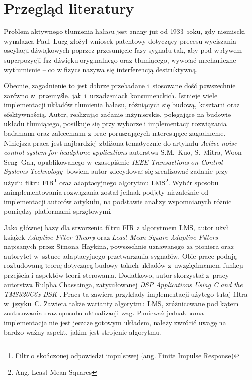 \section{Przegląd literatury}
Problem aktywnego tłumienia hałasu jest znany już od 1933~roku, gdy niemiecki wynalazca Paul~Lueg złożył wniosek patentowy \cite{LuegPatent} dotyczący procesu wyciszania oscylacji dźwiękowych poprzez przesunięcie fazy sygnału tak, aby pod wpływem superpozycji faz dźwięku oryginalnego oraz tłumiącego, wywołać mechaniczne wytłumienie -- co w fizyce nazywa się interferencją destruktywną.

Obecnie, zagadnienie to jest dobrze przebadane i~stosowane dość powszechnie zarówno w~przemyśle, jak~i~urządzeniach konsumenckich. Istnieje wiele implementacji układów tłumienia hałasu, różniących się budową, kosztami oraz efektywnością. Autor, realizując zadanie inżynierskie, polegające na budowie układu tłumiącego, posiłkuje się przy wyborze i implementacji rozwiązania badaniami oraz zaleceniami z prac poruszających interesujące zagadnienie. Niniejsza praca jest najbardziej zbliżona tematycznie do artykułu \textit{Active noise control system for headphone applications} \cite{ANC4HP} autorstwa S.M.~Kuo, S.~Mitra, Woon-Seng~Gan, opublikowanego w~czasopiśmie \textit{IEEE Transactions on Control Systems Technology}, bowiem autor zdecydował się zrealizować zadanie przy użyciu filtru FIR\footnote{Filtr o skończonej odpowiedzi impulsowej (ang. Finite Impulse Response)} oraz  adaptacyjnego algorytmu LMS\footnote{Ang. Least-Mean-Squares}. Wybór sposobu zaimplementowania rozwiązania został jednak podjęty niezależnie od implementacji autorów artykułu, na podstawie analizy wspomnianych różnic pomiędzy platformami sprzętowymi.

Jako głównej bazy dla stworzenia filtru FIR z algorytmem LMS, autor użył książek \textit{Adaptive Filter Theory} \cite{HayAFT} oraz \textit{Least-Mean-Square Adaptive Filters} \cite{HayLMSAF} napisanych przez Simona~Haykina, powszechnie uznawanego za pioniera oraz autorytet w~sztuce adaptacyjnego przetwarzania sygnałów. Obie prace podają rozbudowaną teorię dotyczącą budowy takich układów z~uwzględnieniem funkcji przejścia i aspektów teorii sterowania. Dodatkowo, autor skorzystał z~pracy autorstwa Rulpha Chassainga, zatytułowanej \textit{DSP Applications Using C and the TMS320C6x DSK} \cite{Chassaing}. Praca ta zawiera przykłady implementacji użytego tutaj filtra w~języku~C. Zawiera także warianty algorytmu LMS, zróżnicowane pod kątem zastosowania oraz sposobu aktualizacji wag. Ponieważ jednak sama implementacja nie jest jeszcze gotowym układem, należy zwrócić uwagę na bardzo ważny aspekt, jakim jest strojenie algorytmu.

